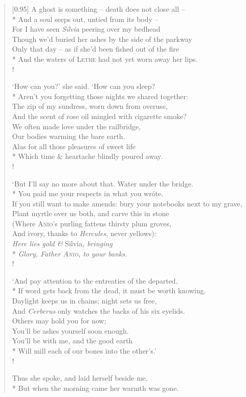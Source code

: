 \begin{verse}[0.95\textwidth]
A ghost is something -- death does not close all --\\*
\vin And a soul seeps out, untied from its body --\\
For I have seen \textit{Silvia} peering over my bedhead\\
\vin Though we'd buried her ashes by the side of the parkway\\
Only that day -- as if she'd been fished out of the fire\\*
\vin And the waters of \textsc{Lethe} had not yet worn away her lips.\\!

`How can you?' she said. `How can you sleep?\\*
\vin Aren't you forgetting those nights we shared together:\nobreak\\
The zip of my sundress, worn down from overuse,\\
\vin And the scent of rose oil mingled with cigarette smoke?\\
We often made love under the railbridge,\\
\vin Our bodies warming the bare earth.\\
Alas for all those pleasures of sweet life\\*
\vin Which time \& heartache blindly poured away.\\!

`But I'll say no more about that. Water under the bridge.\nobreak\\*
\vin You paid me your respects in what you wr\'ote.\\
If you still want to make amends: bury your notebooks next to my grave,\\
\vin Plant myrtle over us both, and carve this in stone\\
(Where \textsc{Anio}'s purling fattens thirsty plum groves,\\
\vin And ivory, thanks to \textit{Hercules}, never yellows):\\
\textit{Here lies gold \& }Silvia\textit{, bringing}\\*
\vin \textit{Glory, Father \textsc{Anio}, to your banks.}\\!

`And pay attention to the entreaties of the departed.\\*
\vin If word gets back from the dead, it must be worth knowing.\\
Daylight keeps us in chains; night sets us free,\\
\vin And \textit{Cerberus} only watches the backs of his six eyelids.\nobreak\\
Others may hold you for now;\\
\vin You'll be ashes yourself soon enough.\\
You'll be with me, and the good earth\\*
\vin Will mill each of our bones into the other's.'\\!

Thus she spoke, and laid herself beside me,\\*
\vin But when the morning came her warmth was gone.
\end{verse}
